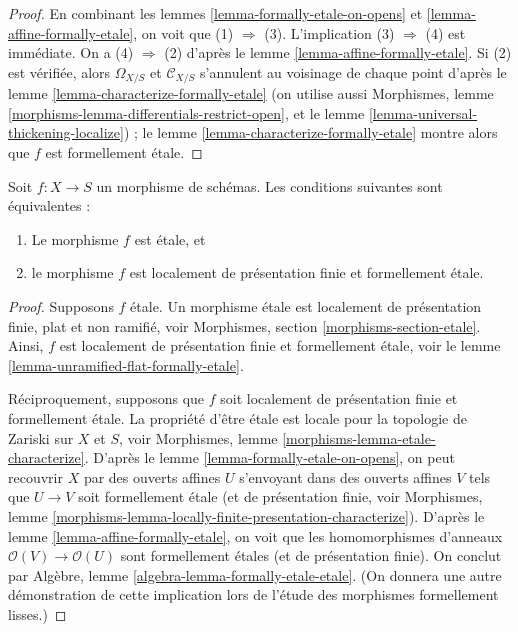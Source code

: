 \begin{proof}
En combinant les lemmes \ref{lemma-formally-etale-on-opens} et
\ref{lemma-affine-formally-etale}, on voit que (1) $\Rightarrow$ (3).
L'implication (3) $\Rightarrow$ (4) est immédiate.
On a (4) $\Rightarrow$ (2) d'après le lemme \ref{lemma-affine-formally-etale}.
Si (2) est vérifiée, alors $\Omega_{X/S}$ et $\mathcal{C}_{X/S}$ s'annulent
au voisinage de chaque point d'après
le lemme \ref{lemma-characterize-formally-etale}
(on utilise aussi Morphismes, lemme
\ref{morphisms-lemma-differentials-restrict-open}, et
le lemme \ref{lemma-universal-thickening-localize}) ; le
lemme \ref{lemma-characterize-formally-etale} montre alors que $f$
est formellement étale.
\end{proof}

\begin{lemma}
\label{lemma-etale-formally-etale}
Soit $f : X \to S$ un morphisme de schémas.
Les conditions suivantes sont équivalentes :
\begin{enumerate}
\item Le morphisme $f$ est étale, et
\item le morphisme $f$ est localement de présentation finie et
formellement étale.
\end{enumerate}
\end{lemma}

\begin{proof}
Supposons $f$ étale.
Un morphisme étale est localement de présentation finie, plat et non ramifié, voir
Morphismes, section \ref{morphisms-section-etale}.
Ainsi, $f$ est localement de présentation finie et formellement étale, voir
le lemme \ref{lemma-unramified-flat-formally-etale}.

\medskip\noindent
Réciproquement, supposons que $f$ soit localement de présentation finie et
formellement étale. La propriété d'être étale est locale pour la topologie de Zariski sur
$X$ et $S$, voir
Morphismes, lemme \ref{morphisms-lemma-etale-characterize}.
D'après
le lemme \ref{lemma-formally-etale-on-opens},
on peut recouvrir $X$ par des ouverts affines $U$ s'envoyant dans des ouverts affines
$V$ tels que $U \to V$ soit formellement étale (et de présentation finie, voir
Morphismes,
lemme \ref{morphisms-lemma-locally-finite-presentation-characterize}).
D'après
le lemme \ref{lemma-affine-formally-etale},
on voit que les homomorphismes d'anneaux $\mathcal{O}(V) \to \mathcal{O}(U)$ sont
formellement étales (et de présentation finie).
On conclut par
Algèbre, lemme \ref{algebra-lemma-formally-etale-etale}.
(On donnera une autre démonstration de cette implication lors de l'étude
des morphismes formellement lisses.)
\end{proof}














